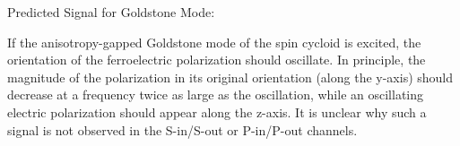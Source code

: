 Predicted Signal for Goldstone Mode:

If the anisotropy-gapped Goldstone mode of the spin cycloid is excited, the orientation of the ferroelectric polarization should oscillate. In principle, the magnitude of the polarization in its original orientation (along the y-axis) should decrease at a frequency twice as large as the oscillation, while an oscillating electric polarization should appear along the z-axis. It is unclear why such a signal is not observed in the S-in/S-out or P-in/P-out channels.
